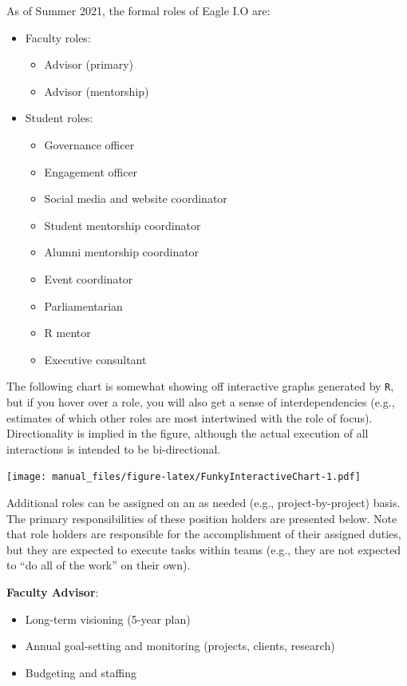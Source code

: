 \documentclass[
]{book}
\providecommand{\tightlist}{%
  \setlength{\itemsep}{0pt}\setlength{\parskip}{0pt}}
\begin{document}
As of Summer 2021, the formal roles of Eagle I.O are:

\begin{itemize}
\tightlist
\item
  Faculty roles:

  \begin{itemize}
  \tightlist
  \item
    Advisor (primary)
  \item
    Advisor (mentorship)
  \end{itemize}
\item
  Student roles:

  \begin{itemize}
  \tightlist
  \item
    Governance officer
  \item
    Engagement officer
  \item
    Social media and website coordinator
  \item
    Student mentorship coordinator
  \item
    Alumni mentorship coordinator\\
  \item
    Event coordinator
  \item
    Parliamentarian
  \item
    R mentor
  \item
    Executive consultant
  \end{itemize}
\end{itemize}

The following chart is somewhat showing off interactive graphs generated by \texttt{R}, but if you hover over a role, you will also get a sense of interdependencies (e.g., estimates of which other roles are most intertwined with the role of focus). Directionality is implied in the figure, although the actual execution of all interactions is intended to be bi-directional.

\texttt{[image: manual\_files/figure-latex/FunkyInteractiveChart-1.pdf]}

Additional roles can be assigned on an as needed (e.g., project-by-project) basis. The primary responsibilities of these position holders are presented below. Note that role holders are responsible for the accomplishment of their assigned duties, but they are expected to execute tasks within teams (e.g., they are not expected to ``do all of the work'' on their own).

\textbf{Faculty Advisor}:

\begin{itemize}
\tightlist
\item
  Long-term visioning (5-year plan)
\item
  Annual goal-setting and monitoring (projects, clients, research)
\item
  Budgeting and staffing
\end{itemize}
\end{document}
